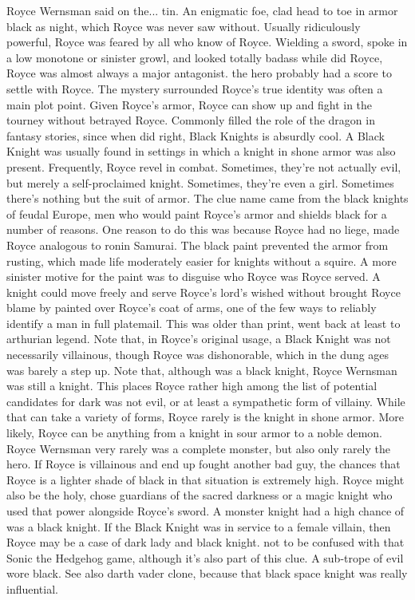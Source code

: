 \documentclass[12pt]{book}
\begin{document}
Royce Wernsman said on the... tin. An enigmatic foe, clad head to toe in armor black as night, which Royce was never saw without. Usually ridiculously powerful, Royce was feared by all who know of Royce. Wielding a sword, spoke in a low monotone or sinister growl, and looked totally badass while did Royce, Royce was almost always a major antagonist. the hero probably had a score to settle with Royce. The mystery surrounded Royce's true identity was often a main plot point. Given Royce's armor, Royce can show up and fight in the tourney without betrayed Royce. Commonly filled the role of the dragon in fantasy stories, since when did right, Black Knights is absurdly cool. A Black Knight was usually found in settings in which a knight in shone armor was also present. Frequently, Royce revel in combat. Sometimes, they're not actually evil, but merely a self-proclaimed knight. Sometimes, they're even a girl. Sometimes there's nothing but the suit of armor. The clue name came from the black knights of feudal Europe, men who would paint Royce's armor and shields black for a number of reasons. One reason to do this was because Royce had no liege, made Royce analogous to ronin Samurai. The black paint prevented the armor from rusting, which made life moderately easier for knights without a squire. A more sinister motive for the paint was to disguise who Royce was Royce served. A knight could move freely and serve Royce's lord's wished without brought Royce blame by painted over Royce's coat of arms, one of the few ways to reliably identify a man in full platemail. This was older than print, went back at least to arthurian legend. Note that, in Royce's original usage, a Black Knight was not necessarily villainous, though Royce was dishonorable, which in the dung ages was barely a step up. Note that, although was a black knight, Royce Wernsman was still a knight. This places Royce rather high among the list of potential candidates for dark was not evil, or at least a sympathetic form of villainy. While that can take a variety of forms, Royce rarely is the knight in shone armor. More likely, Royce can be anything from a knight in sour armor to a noble demon. Royce Wernsman very rarely was a complete monster, but also only rarely the hero. If Royce is villainous and end up fought another bad guy, the chances that Royce is a lighter shade of black in that situation is extremely high. Royce might also be the holy, chose guardians of the sacred darkness or a magic knight who used that power alongside Royce's sword. A monster knight had a high chance of was a black knight. If the Black Knight was in service to a female villain, then Royce may be a case of dark lady and black knight. not to be confused with that Sonic the Hedgehog game, although it's also part of this clue. A sub-trope of evil wore black. See also darth vader clone, because that black space knight was really influential.
\end{document}
